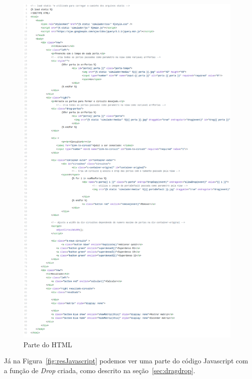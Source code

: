 \documentclass[a4paper, 12pt, oneside]{book}
\begin{document}
\begin{figure}[H]
\centering
\includegraphics[scale=0.35]{index.png}
\caption{Parte do HTML}
\label{fig:resHtml}
\end{figure}

Já na Figura~\ref{fig:resJavascript} podemos ver uma parte do código Javascript com a função de \textit{Drop} criada, como descrito na seção~\ref{sec:dragdrop}.
\end{document}
